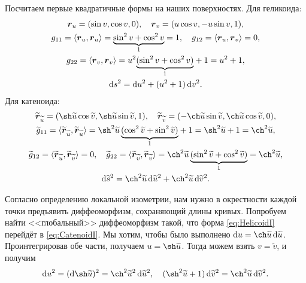 \begin{solution}
	Посчитаем первые квадратичные формы на наших поверхностях. Для геликоида:
	\begin{gather} \label{eq:HelicoidI}
		\boldsymbol{r}_u = (\sin v, \cos v, 0),\quad \boldsymbol{r}_v = (u\cos v, -u\sin v, 1),\nonumber\\
		g_{11} = \langle\boldsymbol{r}_u, \boldsymbol{r}_u\rangle = {\underbrace{\sin^2v + \cos^2v}_{1}} = 1,\quad g_{12} = \langle\boldsymbol{r}_u, \boldsymbol{r}_v\rangle = 0,\nonumber\\
		g_{22} = \langle\boldsymbol{r}_v, \boldsymbol{r}_v\rangle = u^2{\underbrace{(\sin^2v + \cos^2v)}_{1}} + 1 = u^2 + 1,\nonumber\\
		\mathop{}\!\mathrm{d} s^2 = \mathop{}\!\mathrm{d} u^2 + (u^2 + 1)\mathop{}\!\mathrm{d} v^2.
	\end{gather}
	Для катеноида:
	\begin{gather}
		\widetilde{\vec{r}}_{\widetilde{u}} = (\sh \widetilde{u}\cos \widetilde{v}, \sh \widetilde{u}\sin \widetilde{v}, 1),\quad \widetilde{\vec{r}}_{\widetilde{v}} = (-\ch \widetilde{u}\sin \widetilde{v}, \ch \widetilde{u}\cos \widetilde{v}, 0),\nonumber\\
		\widetilde{g}_{11} = \langle\widetilde{\vec{r}}_{\widetilde{u}}, \widetilde{\vec{r}}_{\widetilde{u}}\rangle = \sh^2\widetilde{u}\,{\underbrace{(\cos^2\widetilde{v} + \sin^2\widetilde{v})}_{1}} + 1 = \sh^2\widetilde{u} + 1 = \ch^2\widetilde{u},\nonumber\\
		\widetilde{g}_{12} = \langle\widetilde{\vec{r}}_{\widetilde{u}}, \widetilde{\vec{r}}_{\widetilde{v}}\rangle = 0,\quad
		\widetilde{g}_{22} = \langle\widetilde{\vec{r}}_{\widetilde{v}}, \widetilde{\vec{r}}_{\widetilde{v}}\rangle = \ch^2\widetilde{u}\,{\underbrace{(\sin^2\widetilde{v} + \cos^2\widetilde{v})}_{1}} = \ch^2\widetilde{u},\nonumber\\
		\d\widetilde{s}^2 = \ch^2\widetilde{u}\d\widetilde{u}^2 + \ch^2\widetilde{u}\d\widetilde{v}^2. \label{eq:CatenoidI}
	\end{gather}

	Согласно определению локальной изометрии, нам нужно в окрестности каждой точки предъявить диффеоморфизм, сохраняющий длины кривых. Попробуем найти <<глобальный>> диффеоморфизм такой, что форма \eqref{eq:HelicoidI} перейдёт в \eqref{eq:CatenoidI}. Мы хотим, чтобы было выполнено $\d u = \ch\widetilde{u}\d \widetilde{u}$. Проинтегрировав обе части, получаем $u = \sh\widetilde{u}$. Тогда можем взять $v = \widetilde{v}$, и получим
	\[
		\d u^2 = (\d\sh\widetilde{u})^2 = \ch^2\widetilde{u}^2\d\widetilde{u}^2,\quad(\sh^2\widetilde{u} + 1)\d\widetilde{v}^2 = \ch^2\widetilde{u}\d\widetilde{v}^2.
	\]
\end{solution}

